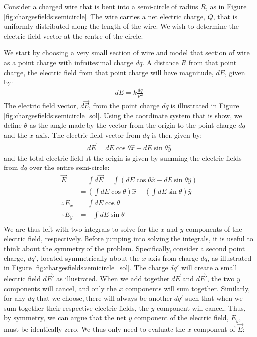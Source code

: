Consider a charged wire that is bent into a semi-circle of radius $R$, as in Figure \ref{fig:chargesfields:semicircle}. The wire carries a net electric charge, $Q$, that is uniformly distributed along the length of the wire. We wish to determine the electric field vector at the centre of the circle. 


We start by choosing a very small section of wire and model that section of wire as a point charge with infinitesimal charge $dq$. A distance $R$ from that point charge, the electric field from that point charge will have magnitude, $dE$, given by:
\begin{align*}
dE=k\frac{dq}{R^2}
\end{align*}
The electric field vector, $d\vec E$, from the point charge $dq$ is illustrated in Figure \ref{fig:chargesfields:semicircle_sol}.
Using the coordinate system that is show, we define $\theta$ as the angle made by the vector from the origin to the point charge $dq$ and the $x$-axis. The electric field vector from $dq$ is then given by:
\begin{align*}
d\vec E = dE\cos\theta \hat x - dE\sin\theta \hat y
\end{align*}
and the total electric field at the origin is given by summing the electric fields from $dq$ over the entire semi-circle:
\begin{align*}
\vec E &= \int d\vec E = \int \left(dE\cos\theta \hat x - dE\sin\theta \hat y\right)\\
&=\left( \int dE\cos\theta \right)\hat x -\left( \int dE\sin\theta \right)\hat y\\
\therefore E_x &= \int dE\cos\theta\\
\therefore E_y &= -\int dE\sin\theta\\
\end{align*}
We are thus left with two integrals to solve for the $x$ and $y$ components of the electric field, respectively. Before jumping into solving the integrals, it is useful to think about the symmetry of the problem. Specifically, consider a second point charge, $dq'$, located symmetrically about the $x$-axis from charge $dq$, as illustrated in Figure \ref{fig:chargesfields:semicircle_sol}. The charge $dq'$ will create a small electric field $d\vec E'$ as illustrated. When we add together $d\vec E$ and $d\vec E'$, the two $y$ components will cancel, and only the $x$ components will sum together. Similarly, for any $dq$ that we choose, there will always be another $dq'$ such that when we sum together their respective electric fields, the $y$ component will cancel. Thus, by symmetry, we can argue that the net $y$ component of the electric field, $E_y$, must be identically zero. We thus only need to evaluate the $x$ component of $\vec E$:

